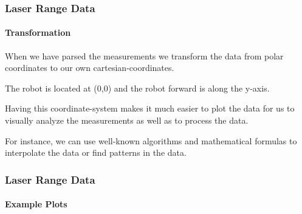\documentclass{beamer}
\begin{document}
\begin{frame}
\frametitle{Laser Range Data}
\framesubtitle{Transformation}

When we have parsed the measurements we transform the data from polar coordinates to our own cartesian-coordinates.

\pause
\vspace{10pt}

The robot is located at (0,0) and the robot forward is along the y-axis.

\pause
\vspace{10pt}

Having this coordinate-system makes it much easier to plot the data for us to visually analyze the measurements as well as to process the data.

\pause
\vspace{10pt}

For instance, we can use well-known algorithms and mathematical formulas to interpolate the data or find patterns in the data.


\end{frame}

\begin{frame}
\frametitle{Laser Range Data}
\framesubtitle{Example Plots}



\end{frame}
\end{document}
